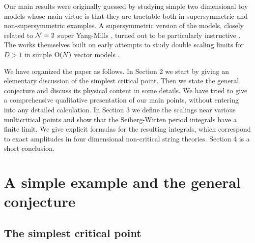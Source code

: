 \documentclass[a4paper,12pt]{article}
\begin{document}
Our main results were originally guessed by
studying simple two dimensional toy models \cite{fer2} whose main virtue
is that they are tractable both in supersymmetric and non-supersymmetric
examples. A supersymmetric version of the models, closely related to
${\cal N}=2$ super Yang-Mills \cite{Dorey}, turned out to be
particularly instructive
\cite{fer3}. The works \cite{fer2,fer3} themselves built on early attempts
to study double scaling limits for $D>1$ in
simple ${\rm O}(N)$ vector models \cite{ZJM}.

We have organized the paper as follows. In Section 2 we start by
giving an elementary
discussion of the simplest critical point. Then we state the general
conjecture and discuss its physical content in some details. We have tried
to give a comprehensive qualitative presentation of our main points, 
without entering into any detailed calculation. In Section 3 we 
define the scalings near various multicritical points and show
that the Seiberg-Witten period integrals have a finite limit. 
We give explicit formulas for the resulting integrals,
which correspond to
exact amplitudes in four dimensional non-critical string theories. Section 
4 is a short conclusion.
\vfill\eject

%
\section{A simple example and the general conjecture}
%

%
\subsection{The simplest critical point}
%
\end{document}
